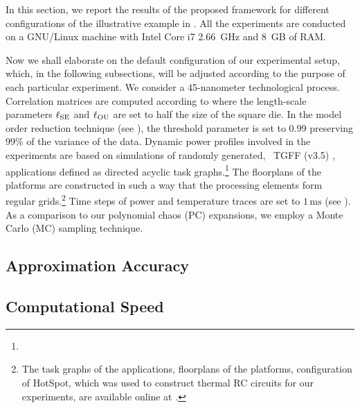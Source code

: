 
In this section, we report the results of the proposed framework for different configurations of the illustrative example in .
All the experiments are conducted on a GNU/Linux machine with Intel Core i7 2.66~GHz and 8~GB of RAM.

Now we shall elaborate on the default configuration of our experimental setup, which, in the following subsections, will be adjusted according to the purpose of each particular experiment.
We consider a 45-nanometer technological process.
Correlation matrices are computed according to  where the length-scale parameters $\ell_{\text{SE}}$ and $\ell_{\text{OU}}$ are set to half the size of the square die.
In the model order reduction technique (see ), the threshold parameter is set to 0.99 preserving 99\% of the variance of the data.
Dynamic power profiles involved in the experiments are based on simulations of randomly generated, \via\ TGFF (v3.5) \cite{dick1998}, applications defined as directed acyclic task graphs.\footnote{}
The floorplans of the platforms are constructed in such a way that the processing elements form regular grids.\footnote{The task graphs of the applications, floorplans of the platforms, configuration of HotSpot, which was used to construct thermal RC circuits for our experiments, are available online at \cite{sources}.}
Time steps of power and temperature traces are set to $1\,\text{ms}$ (see ).
As a comparison to our polynomial chaos (PC) expansions, we employ a Monte Carlo (MC) sampling technique.


\subsection{Approximation Accuracy} 


\subsection{Computational Speed} 

